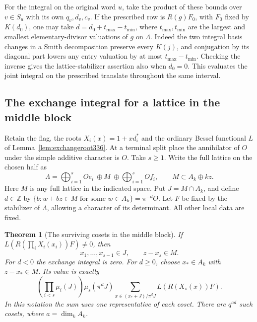 \documentclass[a4paper,11pt]{article}
\newtheorem{theorem}[proposition]{Theorem}
\theoremstyle{definition}
\theoremstyle{remark}
\numberwithin{equation}{section}
\begin{document}
For the integral on the original word \(u\), take the product of
these bounds over \(v\in S_u\) with its own \(q_v,d_v,c_v\).
If the prescribed row is \(R(g)F_0\), with \(F_0\) fixed by
\(K(d_0)\), one may take \(d=d_0+t_{\max}-t_{\min}\),
where \(t_{\max},t_{\min}\) are the largest and smallest
elementary-divisor valuations of \(g\) on \(\Lambda\).
Indeed the two integral basis changes in a Smith decomposition
preserve every \(K(j)\), and conjugation by its diagonal part
lowers any entry valuation by at most \(t_{\max}-t_{\min}\).
Checking the inverse gives the lattice-stabilizer assertion also
when \(d_0=0\). This evaluates the joint integral on the
prescribed translate throughout the same interval.


\subsection{The exchange integral for a lattice in the middle block}\label{sec:middlecollapse337}
Retain the flag, the roots \(X_i(x)=1+xd_i^*\) and the ordinary
Bessel functional \(L\) of Lemma~\ref{lem:exchangeroot336}.
At a terminal split place the annihilator of \(O\) under the simple
additive character is \(O\). Take \(s\ge1\).
Write the full lattice on the chosen half as
\[
 \Lambda=\bigoplus_{i=1}^s Oe_i\ \oplus M\ \oplus
                  \bigoplus_{i=1}^s Of_i ,
 \qquad M\subset A_k\oplus kz .
\]
Here \(M\) is any full lattice in the indicated space. Put
\(J=M\cap A_k\), and define \(d\in\mathbb Z\) by
\(\{b:w+bz\in M\text{ for some }w\in A_k\}=\pi^{-d}O\).
Let \(F\) be fixed by the stabilizer of \(\Lambda\), allowing
a character of its determinant. All other local data are fixed.
\begin{theorem}[The surviving cosets in the middle block]\label{thm:middlecollapse337}
If \(L(R(\prod_i X_i(x_i))F)\ne0\), then
\[
       x_1,\ldots,x_{s-1}\in J,\qquad z-x_s\in M .
\]
For \(d<0\) the exchange integral is zero. For \(d\ge0\), choose
\(x_*\in A_k\) with \(z-x_*\in M\). Its value is exactly
\[
 \left(\prod_{i<s}\mu_i(J)\right)\mu_s(\pi^dJ)
 \sum_{x\in(x_*+J)/\pi^dJ} L(R(X_s(x))F).
\]
In this notation the sum uses one representative of each coset.
There are \(q^{ad}\) such cosets, where \(a=\dim_k A_k\).
\end{theorem}
\end{document}
